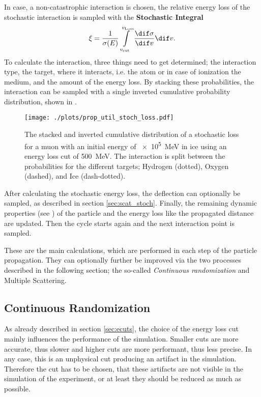 In case, a non-catastrophic interaction is chosen, the relative energy loss of the stochastic interaction is sampled with the \textbf{Stochastic Integral}
\begin{align}
    \xi = \frac{1}{\sigma(E)} \int\limits_{v_{\text{cut}}}^{v_{\text{Loss}}} \frac{\dif \sigma}{\dif v} \dif v .
\end{align}
To calculate the interaction, three things need to get determined; the interaction type, the target, where it interacts, i.e. the atom or in case of ionization the medium, and the amount of the energy loss.
By stacking these probabilities, the interaction can be sampled with a single inverted cumulative probability distribution, shown in .
\begin{figure}
    \centering
    \texttt{[image: ./plots/prop\_util\_stoch\_loss.pdf]}
    \caption{The stacked and inverted cumulative distribution of a stochastic loss for a muon with an initial energy of \SI{e5}{MeV} in ice using an energy loss cut of \SI{500}{MeV}. The interaction is split between the probabilities for the different targets; Hydrogen (dotted), Oxygen (dashed), and Ice (dash-dotted).}
    \label{fig:prop_util_stoch_loss}
\end{figure}

After calculating the stochastic energy loss, the deflection can optionally be sampled, as described in section \ref{sec:scat_stoch}.
Finally, the remaining dynamic properties (see ) of the particle and the energy loss like the propagated distance are updated.
Then the cycle starts again and the next interaction point is sampled.

These are the main calculations, which are performed in each step of the particle propagation.
They can optionally further be improved via the two processes described in the following section; the so-called \textit{Continuous randomization} and Multiple Scattering.

\subsection{Continuous Randomization} \label{sec:cont_rand}

As already described in section \ref{sec:ecuts}, the choice of the energy loss cut mainly influences the performance of the simulation.
Smaller cuts are more accurate, thus slower and higher cuts are more performant, thus less precise. 
In any case, this is an unphysical cut producing an artifact in the simulation.
Therefore the cut has to be chosen, that these artifacts are not visible in the simulation of the experiment, or at least they should be reduced as much as possible.

